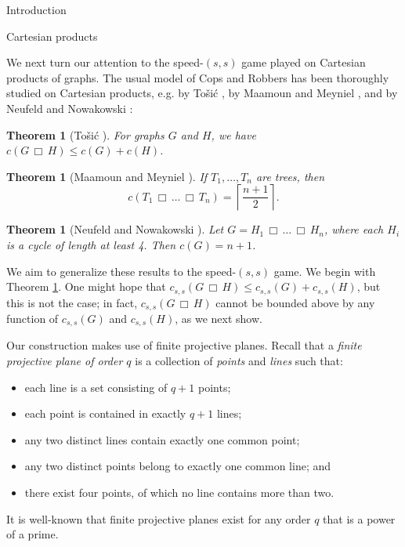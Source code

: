 \documentclass[12pt]{amsart}
\newcommand{\ceil}[1]{\ensuremath{\left\lceil #1\right\rceil} }
\newtheorem{theorem}[lemma]{Theorem}
\theoremstyle{definition}
\def\cart{\, \Box \,}
\newcommand{\speeds}{c_{s,s}}
\begin{document}
\begin{section}{Introduction}
\begin{section}{Cartesian products}\label{sec:Cartesian}

We next turn our attention to the speed-$(s,s)$ game played on Cartesian products of graphs.  The usual model of Cops and Robbers has been thoroughly studied on Cartesian products, e.g. by To\v{s}i\'{c} \cite{Tos87}, by Maamoun and Meyniel \cite{MM87}, and by Neufeld and Nowakowski \cite{NN98}:

\begin{theorem}[To\v{s}i\'{c} \cite{Tos87}]\label{thm:regular_general_product}
For graphs $G$ and $H$, we have $c(G \cart H) \le c(G) + c(H)$.
\end{theorem}

\begin{theorem}[Maamoun and Meyniel \cite{MM87}]\label{thm:regular_product_of_trees}
If $T_1, \dots, T_n$ are trees, then 
$$c(T_1 \cart \dots \cart T_n) = \ceil{\frac{n+1}{2}}.$$
\end{theorem}

\begin{theorem}[Neufeld and Nowakowski \cite{NN98}]\label{thm:regular_product_of_cycles}
Let $G = H_1 \cart \dots \cart H_n$, where each $H_i$ is a cycle of length at least 4.  Then $c(G) = n+1$.
\end{theorem}

We aim to generalize these results to the speed-$(s,s)$ game.  We begin with Theorem \ref{thm:regular_general_product}.  One might hope that $\speeds(G \cart H) \le \speeds(G) + \speeds(H)$, but this is not the case; in fact, $\speeds(G \cart H)$ cannot be bounded above by any function of $\speeds(G)$ and $\speeds(H)$, as we next show.

Our construction makes use of finite projective planes.  Recall that a \textit{finite projective plane of order $q$} is a collection of \textit{points} and \textit{lines} such that:
\begin{itemize}
\item [\textbf{(1)}] each line is a set consisting of $q+1$ points;
\item [\textbf{(2)}] each point is contained in exactly $q+1$ lines;
\item [\textbf{(3)}] any two distinct lines contain exactly one common point; 
\item [\textbf{(4)}] any two distinct points belong to exactly one common line; and
\item [\textbf{(5)}] there exist four points, of which no line contains more than two.
\end{itemize}
It is well-known that finite projective planes exist for any order $q$ that is a power of a prime.


\end{section}
\end{section}
\end{document}

